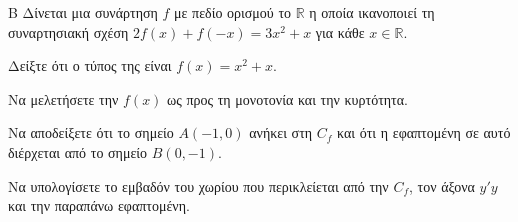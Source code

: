 \begin{thema}{Β}
Δίνεται μια συνάρτηση $f$ με πεδίο ορισμού το $\mathbb{R}$ η οποία ικανοποιεί τη συναρτησιακή σχέση $2f(x) + f(-x) = 3x^2 + x$ για κάθε $x \in \mathbb{R}$.
\begin{erwthma}
  \item Δείξτε ότι ο τύπος της είναι $f(x) = x^2 + x$.
  \item Να μελετήσετε την $f(x)$ ως προς τη μονοτονία και την κυρτότητα.
  \item Να αποδείξετε ότι το σημείο $Α(-1, 0)$ ανήκει στη $C_f$ και ότι η εφαπτομένη σε αυτό διέρχεται από το σημείο $Β(0, -1)$.
  \item Να υπολογίσετε το εμβαδόν του χωρίου που περικλείεται από την $C_f$, τον άξονα $y'y$ και την παραπάνω εφαπτομένη.
\end{erwthma}
\end{thema}
